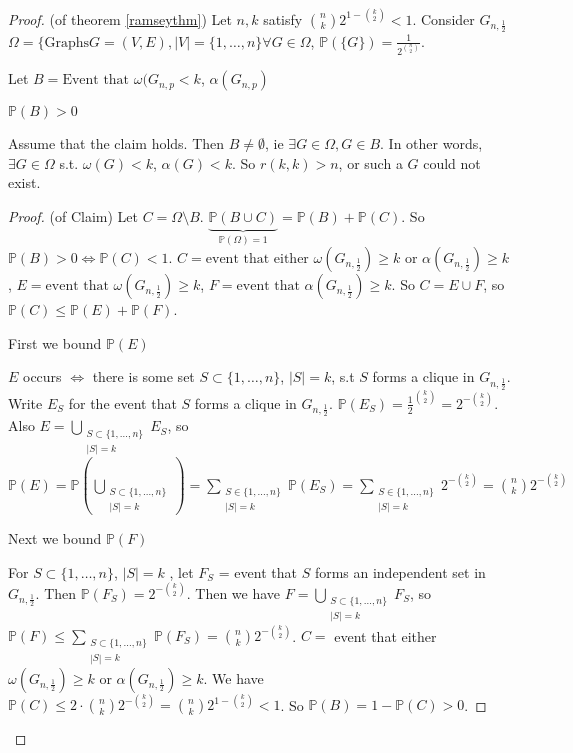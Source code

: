 \documentclass{article}
\begin{document}
\begin{proof}
(of theorem \ref{ramseythm}) Let $n,k$ satisfy ${n \choose k} 2^{1-{k \choose 2}}<1$.  Consider $G_{n,\frac{1}{2}}$ $\Omega = \{ \text{Graphs} G=(V,E), |V| = \{ 1, \dots, n \} \forall G \in \Omega$, $\mathbb{P}(\{G\}) = \frac{1}{2^{ {n \choose 2}  }}$.

Let $B =  \text{Event that }\omega(G_{n,p}<k$, $\alpha(G_{n,p})$

\begin{clm}
$\mathbb{P}(B)>0$
\end{clm}

Assume that the claim holds.  Then $B \neq \emptyset$, ie $\exists G \in \Omega, G \in B $. In other words, $\exists G \in \Omega$ s.t. $\omega(G) < k $, $\alpha(G) <k$.  So $r(k,k) >n$, or such a  $G$ could not exist.

\begin{proof}
(of Claim) Let $C = \Omega \setminus B$.  $\underbrace{\mathbb{P}(B \cup C)}_{\mathbb{P}(\Omega) = 1} = \mathbb{P}(B) + \mathbb{P}(C)$.  So $\mathbb{P}(B) > 0 \iff \mathbb{P}(C) <1$.  $C = \text{event that either }\omega(G_{n,\frac{1}{2}}) \ge k \text{ or }\alpha(G_{n, \frac{1}{2}}) \ge k$, $E = \text{event that }\omega(G_{n, \frac{1}{2}}) \ge k$, $F = \text{event that }\alpha (G_{n, \frac{1}{2}}) \ge k$.  So $C = E \cup F$, so $\mathbb{P}(C) \le \mathbb{P}(E) + \mathbb{P}(F)$.

First we bound $\mathbb{P}(E)$

$E$ occurs $\iff$ there is some set $S \subset \{1, \dots, n \}$, $|S| = k$, s.t $S$ forms a clique in $G_{n, \frac{1}{2}}$.  Write $E_S$ for the event that $S$ forms a clique in $G_{n, \frac{1}{2}}$.  $\mathbb{P}(E_S) = \frac{1}{2}^{  {k \choose 2}} = 2^{-{k \choose 2}}$.  Also $\displaystyle E = \bigcup_{\substack{S \subset \{1, \dots, n\} \\ |S| = k}} E_S$, so $\displaystyle \mathbb{P}(E) = \mathbb{P}(\bigcup_{\substack{S \subset \{1, \dots, n\}\\|S| = k}}) = \sum_{\substack{S \in \{1, \dots, n\}\\|S|=k}} \mathbb{P}(E_S) = \sum_{\substack{S \in \{1, \dots, n\}\\|S|=k}} 2^{-{k \choose 2}} = {n \choose k} 2^{-{k \choose 2}}$

Next we bound $\mathbb{P}(F)$

For $S \subset \{1, \dots , n\}$, $|S| = k$ , let $F_S$ = event that $S$ forms an independent set in $G_{n, \frac{1}{2}}$.  Then $\mathbb{P}(F_S) = 2^{-{k \choose 2}}$.  Then we have $\displaystyle F = \bigcup_{\substack{S \subset \{1, \dots, n\} \\ |S| = k}}F_S$, so $\displaystyle \mathbb{P}(F) \le \sum_{\substack{S \subset \{1, \dots, n\} \\ |S| = k}} \mathbb{P}(F_S) = { n \choose k} 2^{-{k \choose 2}}$.  $C =$ event that either $\omega(G_{n, \frac{1}{2}}) \ge k$  or $\alpha(G_{n,\frac{1}{2}}) \ge k$.  We have $\mathbb{P}(C) \le 2 \cdot {n \choose k} 2^{-{k \choose 2}} = {n \choose k } 2^{1-{k\choose 2}}<1$. So $\mathbb{P}(B) = 1 - \mathbb{P}(C) >0$.
\end{proof}
\end{proof}
\end{document}
